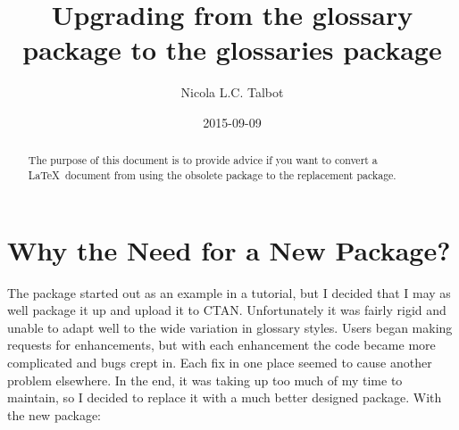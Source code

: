 \documentclass{nlctdoc}
\title{Upgrading from the glossary package to the glossaries
package}
\author{Nicola L.C. Talbot}
\date{2015-09-09}
\begin{document}
\maketitle

\begin{abstract}
The purpose of this document is to provide advice if you want to
convert a \LaTeX\ document from using the obsolete 
package to the replacement  package.
\end{abstract}

\tableofcontents

\section{Why the Need for a New Package?}
\label{whyglossaries}

The  package started out as an example in a tutorial,
but I decided that I may as well package it up and upload it to CTAN.
Unfortunately it was fairly rigid and unable to adapt well to the
wide variation in glossary styles. Users began making requests for
enhancements, but with each enhancement the code became more
complicated and bugs crept in. Each fix in one place seemed to cause
another problem elsewhere. In the end, it was taking up too much
of my time to maintain, so I decided to replace it with a much
better designed package. With the new  package:
\end{document}
